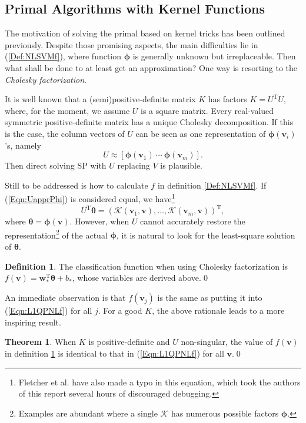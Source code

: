 \documentclass[11pt,a4paper]{article}
\theoremstyle{definition}
\newtheorem{theo}{Theorem}
\newtheorem{defi}{Definition}
\renewcommand{\vec}[1]{\boldsymbol{#1}}
\begin{document}
    \subsection{Primal Algorithms with Kernel Functions\label{Sec:PAwKnl}}
      The motivation of solving the primal based on kernel tricks has been outlined previously. Despite those promising aspects, the main difficulties lie in (\ref{Def:NLSVMf}), where function $\vec{\phi}$ is generally unknown but irreplaceable. Then what shall be done to at least get an approximation? One way is resorting to the \textit{Cholesky factorization}.

      It is well known that a (semi)positive-definite matrix $K$ has factors $K=U^{\mathrm{T}}U$, where, for the moment, we assume $U$ is a square matrix. Every real-valued symmetric positive-definite matrix has a unique Cholesky decomposition\cite[p.143]{golub1996matrix}. If this is the case, the column vectors of $U$ can be seen as one representation of $\vec{\phi}(\vec{v}_{i})$'s, namely
      \begin{equation}\label{Eqn:UapprPhi}
        U\approx\left[\vec{\phi}(\vec{v}_{1})~\cdots~\vec{\phi}(\vec{v}_{m})\right].
      \end{equation}
      Then direct solving SP with $U$ replacing $V$ is plausible.

      Still to be addressed is how to calculate $f$ in definition \ref{Def:NLSVMf}. If (\ref{Eqn:UapprPhi}) is considered equal, we have\footnote{Fletcher et al. \cite{fletcher2010binary} have also made a typo in this equation, which took the authors of this report several hours of discouraged debugging.}
      \begin{equation}\label{Eqn:theta}
        U^{\mathrm{T}}\vec{\theta}=(\mathcal{K}(\vec{v}_{1},\vec{v}),\dots,\mathcal{K}(\vec{v}_{m},\vec{v}))^{\mathrm{T}},
      \end{equation}
      where $\vec{\theta}=\vec{\phi}(\vec{v})$. However, when $U$ cannot accurately restore the representation\footnote{Examples are abundant where a single $\mathcal{K}$ has numerous possible factors $\vec{\phi}$.} of the actual $\vec{\phi}$, it is natural to look for the least-square solution of $\vec{\theta}$.

      \begin{defi}\label{Def:CFf}
        The classification function when using Cholesky factorization is $f(\vec{v})=\vec{w}_{*}^{\mathrm{T}}\vec{\theta}+b_{*}$, whose variables are derived above.\qed
      \end{defi}
      An immediate observation is that $f(\vec{v}_{j})$ is the same as putting it into (\ref{Eqn:L1QPNLf}) for all $j$. For a good $K$, the above rationale leads to a more inspiring result.
      \begin{theo}
        When $K$ is positive-definite and $U$ non-singular, the value of $f(\vec{v})$ in definition \ref{Def:CFf} is identical to that in (\ref{Eqn:L1QPNLf}) for all $\vec{v}$.\qed
      \end{theo}
\end{document}
